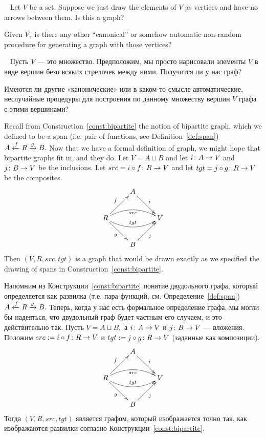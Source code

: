 \documentclass[../main/CT4S-EN-RU]{subfiles}
\begin{document}
\begin{exerciseENG}~
\sexc Let $V$ be a set. Suppose we just draw the elements of $V$ as vertices and have no arrows between them. Is this a graph?
\item Given $V,$ is there any other “canonical” or somehow automatic non-random procedure for generating a graph with those vertices? 
\endsexc
\end{exerciseENG}

\begin{exerciseRUS}~
\sexc Пусть $V$ — это множество. Предположим, мы просто нарисовали элементы $V$ в виде вершин безо всяких стрелочек между ними. Получится ли у нас граф?
\item Имеются ли другие «канонические» или в каком-то смысле автоматические, неслучайные процедуры для построения по данному множеству вершин $V$ графа с этими вершинами? 
\endsexc
\end{exerciseRUS}

\begin{exampleENG}
Recall from Construction~\ref{const:bipartite} the notion of bipartite graph, which we defined to be a span (i.e. pair of functions, see Definition~\ref{def:span}) $A\xleftarrow{f}R\xrightarrow{g}B.$ Now that we have a formal definition of graph, we might hope that bipartite graphs fit in, and they do. Let $V=A\sqcup B$ and let $i\colon A\rightarrow V$ and $j\colon B\rightarrow V$ be the inclusions. Let $src=i\circ f\colon R\rightarrow V$ and let $tgt=j\circ g\colon R\rightarrow V$ be the composites.
$$
\xymatrix{&A\ar[dr]^i\\R\ar@/^1pc/[rr]_{src}\ar@/_1pc/[rr]^{tgt}\ar[ur]^f\ar[dr]_g&&V\\&B\ar[ur]_j}
$$ 
Then $(V,R,src,tgt)$ is a graph that would be drawn exactly as we specified the drawing of spans in Construction~\ref{const:bipartite}.
\end{exampleENG}

\begin{exampleRUS}
Напомним из Конструкции~\ref{const:bipartite} понятие двудольного графа, который определяется как развилка (т.е. пара функций, см. Определение~\ref{def:span}) $A\xleftarrow{f}R\xrightarrow{g}B.$ Теперь, когда у нас есть формальное определение графа, мы могли бы надеяться, что двудольный граф будет частным его случаем, и это действительно так. Пусть $V=A\sqcup B,$ а $i\colon A\rightarrow V$ и $j\colon B\rightarrow V$ — вложения. Положим $src:=i\circ f\colon R\rightarrow V$ и $tgt:=j\circ g\colon R\rightarrow V$ (заданные как композиции).
$$\xymatrix{
      &  A\ar[dr]^i  \\
    R\ar@/^1pc/[rr]_{src}\ar@/_1pc/[rr]^{tgt}\ar[ur]^f\ar[dr]_g  &  &  V  \\
      &  B\ar[ur]_j
}$$ 
Тогда $(V,R,src,tgt)$ является графом, который изображается точно так, как изображаются развилки согласно Конструкции~\ref{const:bipartite}.
\end{exampleRUS}
\end{document}
